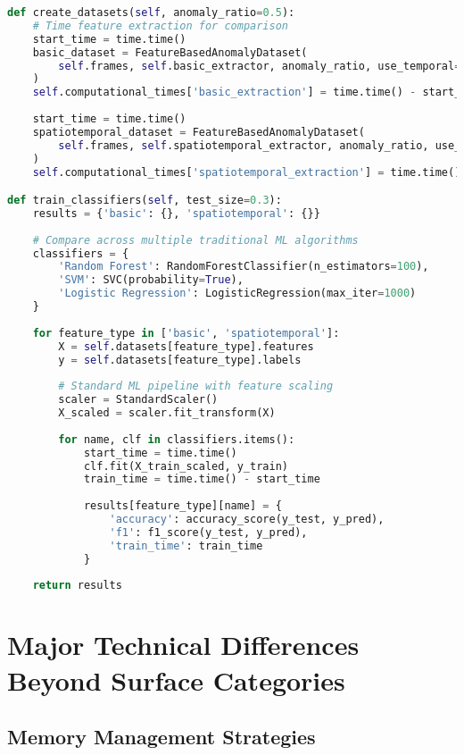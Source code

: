 \documentclass[11pt,a4paper]{article}
\begin{document}
\begin{lstlisting}[language=Python, caption=Feature-Based Evaluation]
def create_datasets(self, anomaly_ratio=0.5):
    # Time feature extraction for comparison
    start_time = time.time()
    basic_dataset = FeatureBasedAnomalyDataset(
        self.frames, self.basic_extractor, anomaly_ratio, use_temporal=False
    )
    self.computational_times['basic_extraction'] = time.time() - start_time
    
    start_time = time.time()
    spatiotemporal_dataset = FeatureBasedAnomalyDataset(
        self.frames, self.spatiotemporal_extractor, anomaly_ratio, use_temporal=True
    )
    self.computational_times['spatiotemporal_extraction'] = time.time() - start_time

def train_classifiers(self, test_size=0.3):
    results = {'basic': {}, 'spatiotemporal': {}}
    
    # Compare across multiple traditional ML algorithms
    classifiers = {
        'Random Forest': RandomForestClassifier(n_estimators=100),
        'SVM': SVC(probability=True),
        'Logistic Regression': LogisticRegression(max_iter=1000)
    }
    
    for feature_type in ['basic', 'spatiotemporal']:
        X = self.datasets[feature_type].features
        y = self.datasets[feature_type].labels
        
        # Standard ML pipeline with feature scaling
        scaler = StandardScaler()
        X_scaled = scaler.fit_transform(X)
        
        for name, clf in classifiers.items():
            start_time = time.time()
            clf.fit(X_train_scaled, y_train)
            train_time = time.time() - start_time
            
            results[feature_type][name] = {
                'accuracy': accuracy_score(y_test, y_pred),
                'f1': f1_score(y_test, y_pred),
                'train_time': train_time
            }
    
    return results
\end{lstlisting}

\section{Major Technical Differences Beyond Surface Categories}

\subsection{Memory Management Strategies}
\end{document}
